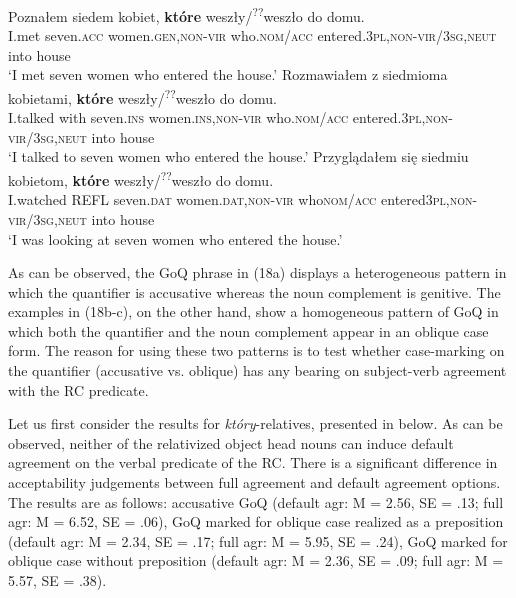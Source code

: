 \documentclass[output=paper]{langsci/langscibook}
\begin{document}
\ea%
    \label{ex:leska:18}
    \ea
    \gll Poznałem   siedem   kobiet,   \textbf{które}     weszły/\textsuperscript{??}weszło   do   domu.  \\
          I.met   seven.\textsc{acc}   women.\textsc{gen,non-vir}  who.\textsc{nom/acc} entered.\textsc{3pl,non-vir}/\textsc{3sg,neut}   into  house  \\
    \glt ‘I met seven women who entered the house.’
    \ex
    \gll Rozmawiałem   z   siedmioma  kobietami,  \textbf{które}                                                          weszły/\textsuperscript{??}weszło   do   domu.\\
         I.talked   with   seven.\textsc{ins}   women.\textsc{ins,non-vir}  who.\textsc{nom/acc}      entered.\textsc{3pl,non-vir}/\textsc{3sg,neut} into   house   \\
    \glt ‘I talked to seven women who entered the house.’
    \ex 
    \gll Przyglądałem się   siedmiu   kobietom,    \textbf{które}    weszły/\textsuperscript{??}weszło       do   domu.\\
         I.watched    \textsc{REFL}   seven.\textsc{dat}   women.\textsc{dat,non-vir}   who\textsc{nom/acc} entered\textsc{3pl,non-vir}/\textsc{3sg,neut}   into house \\
    \glt ‘I was looking at seven women who entered the house.’
    \z
\z
  
As can be observed, the GoQ phrase in (18a) displays a heterogeneous pattern in which the quantifier is accusative whereas the noun complement is genitive. The examples in (18b-c), on the other hand, show a homogeneous pattern of GoQ in which both the quantifier and the noun complement appear in an oblique case form. The reason for using these two patterns is to test whether case-marking on the quantifier (accusative vs. oblique) has any bearing on subject-verb agreement with the RC predicate.

Let us first consider the results for \textit{który}{}-relatives, presented in  below. As can be observed, neither of the relativized object head nouns can induce default agreement on the verbal predicate of the RC. There is a significant difference in acceptability judgements between full agreement and default agreement options. The results are as follows: accusative GoQ (default agr: M = 2.56, SE = .13; full agr: M = 6.52, SE = .06), GoQ marked for oblique case realized as a preposition (default agr: M = 2.34, SE = .17; full agr: M = 5.95, SE = .24), GoQ marked for oblique case without preposition (default agr: M = 2.36, SE = .09; full agr: M = 5.57, SE = .38).
\end{document}
